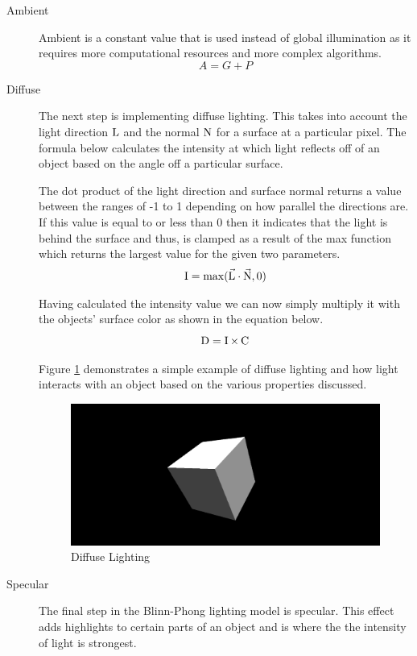 \documentclass[11pt]{article}
\begin{document}
\begin{description}
  \item[Ambient] Ambient is a constant value that is used instead of global illumination
    as it requires more computational resources and more complex algorithms.
    \begin{equation}
      A = G + P
    \end{equation}
  \item[Diffuse] The next step is implementing diffuse lighting. This takes into
    account the light direction $\operatorname{L}$ and the normal $\operatorname{N}$ for a
    surface at a particular pixel. The formula below calculates the intensity at
    which light reflects off of an object based on the angle off a particular
    surface.
    
    The dot product of the light direction and surface normal returns a value
    between the ranges of -1 to 1 depending on how parallel the directions are.
    If this value is equal to or less than 0 then it indicates that the light is
    behind the surface and thus, is clamped as a result of the max function
    which returns the largest value for the given two parameters.
    \begin{gather}
      \operatorname{I} = \operatorname{max}(\vec{\operatorname{L}} \cdot \vec{\operatorname{N}}, 0) \\
    \end{gather}
    
    Having calculated the intensity value we can now simply multiply it with the
    objects' surface color as shown in the equation below.
    \begin{equation}
      \operatorname{D} = \operatorname{I} \times \operatorname{C}
    \end{equation}
    
    Figure \ref{fig:diffuse} demonstrates a simple example of diffuse lighting
    and how light interacts with an object based on the various properties
    discussed. 
    \begin{figure}[H]
      \centering
      \includegraphics[width=\textwidth]{images/diffuse_lighting.png}
      \caption{Diffuse Lighting}
      \label{fig:diffuse}
    \end{figure}
  \item[Specular] The final step in the Blinn-Phong lighting model is specular.
  This effect adds highlights to certain parts of an object and is where the
  the intensity of light is strongest.
\end{description}
\end{document}
